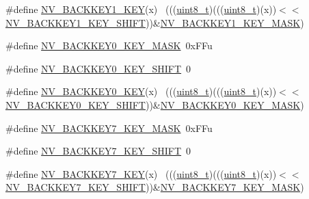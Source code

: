 \begin{DoxyCompactItemize}
\item 
\#define \hyperlink{group___n_v___register___masks_gacd7a10179786650c77f0f094f6840a3c}{N\+V\+\_\+\+B\+A\+C\+K\+K\+E\+Y1\+\_\+\+K\+EY}(x)                                          ~(((\hyperlink{_p_e___types_8h_aba7bc1797add20fe3efdf37ced1182c5}{uint8\+\_\+t})(((\hyperlink{_p_e___types_8h_aba7bc1797add20fe3efdf37ced1182c5}{uint8\+\_\+t})(x))$<$$<$\hyperlink{group___n_v___register___masks_ga71418f17e11f902066ca404fbe473aef}{N\+V\+\_\+\+B\+A\+C\+K\+K\+E\+Y1\+\_\+\+K\+E\+Y\+\_\+\+S\+H\+I\+FT}))\&\hyperlink{group___n_v___register___masks_ga6cd05d78b113df7f3cb0d11d29931666}{N\+V\+\_\+\+B\+A\+C\+K\+K\+E\+Y1\+\_\+\+K\+E\+Y\+\_\+\+M\+A\+SK})
\item 
\#define \hyperlink{group___n_v___register___masks_gafa0e31ca33d445d47d2fd89785e4ec9b}{N\+V\+\_\+\+B\+A\+C\+K\+K\+E\+Y0\+\_\+\+K\+E\+Y\+\_\+\+M\+A\+SK}~0x\+F\+Fu
\item 
\#define \hyperlink{group___n_v___register___masks_ga381e2b0a778da31fa6c795550e71aed8}{N\+V\+\_\+\+B\+A\+C\+K\+K\+E\+Y0\+\_\+\+K\+E\+Y\+\_\+\+S\+H\+I\+FT}~0
\item 
\#define \hyperlink{group___n_v___register___masks_ga119a9432df0049c7606825aee3a20f31}{N\+V\+\_\+\+B\+A\+C\+K\+K\+E\+Y0\+\_\+\+K\+EY}(x)                                          ~(((\hyperlink{_p_e___types_8h_aba7bc1797add20fe3efdf37ced1182c5}{uint8\+\_\+t})(((\hyperlink{_p_e___types_8h_aba7bc1797add20fe3efdf37ced1182c5}{uint8\+\_\+t})(x))$<$$<$\hyperlink{group___n_v___register___masks_ga381e2b0a778da31fa6c795550e71aed8}{N\+V\+\_\+\+B\+A\+C\+K\+K\+E\+Y0\+\_\+\+K\+E\+Y\+\_\+\+S\+H\+I\+FT}))\&\hyperlink{group___n_v___register___masks_gafa0e31ca33d445d47d2fd89785e4ec9b}{N\+V\+\_\+\+B\+A\+C\+K\+K\+E\+Y0\+\_\+\+K\+E\+Y\+\_\+\+M\+A\+SK})
\item 
\#define \hyperlink{group___n_v___register___masks_gac3f2bc7dd55b7951d70a5d1fcb6552b8}{N\+V\+\_\+\+B\+A\+C\+K\+K\+E\+Y7\+\_\+\+K\+E\+Y\+\_\+\+M\+A\+SK}~0x\+F\+Fu
\item 
\#define \hyperlink{group___n_v___register___masks_gad6bef74e61e792dfa5b7d195e4ce5620}{N\+V\+\_\+\+B\+A\+C\+K\+K\+E\+Y7\+\_\+\+K\+E\+Y\+\_\+\+S\+H\+I\+FT}~0
\item 
\#define \hyperlink{group___n_v___register___masks_gad81b2addd996d3f0ee299e252d88b0a9}{N\+V\+\_\+\+B\+A\+C\+K\+K\+E\+Y7\+\_\+\+K\+EY}(x)                                          ~(((\hyperlink{_p_e___types_8h_aba7bc1797add20fe3efdf37ced1182c5}{uint8\+\_\+t})(((\hyperlink{_p_e___types_8h_aba7bc1797add20fe3efdf37ced1182c5}{uint8\+\_\+t})(x))$<$$<$\hyperlink{group___n_v___register___masks_gad6bef74e61e792dfa5b7d195e4ce5620}{N\+V\+\_\+\+B\+A\+C\+K\+K\+E\+Y7\+\_\+\+K\+E\+Y\+\_\+\+S\+H\+I\+FT}))\&\hyperlink{group___n_v___register___masks_gac3f2bc7dd55b7951d70a5d1fcb6552b8}{N\+V\+\_\+\+B\+A\+C\+K\+K\+E\+Y7\+\_\+\+K\+E\+Y\+\_\+\+M\+A\+SK})
$$
\end{DoxyCompactItemize}
